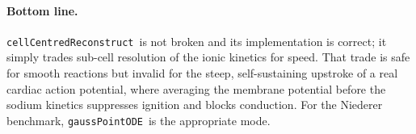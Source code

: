 \documentclass[11pt,a4paper]{article}
\newcommand{\code}[1]{\texttt{\small #1}}
\newcommand{\gpode}{\code{gaussPointODE}}
\newcommand{\ccrec}{\code{cellCentredReconstruct}}
\begin{document}
\paragraph{Bottom line.} \ccrec\ is not broken and its implementation is correct;
it simply trades sub-cell resolution of the ionic kinetics for speed. That trade
is safe for smooth reactions but invalid for the steep, self-sustaining upstroke
of a real cardiac action potential, where averaging the membrane potential before
the sodium kinetics suppresses ignition and blocks conduction. For the Niederer
benchmark, \gpode\ is the appropriate mode.
\end{document}
